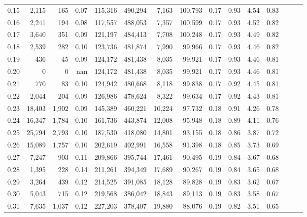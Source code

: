 \begin{tabular}{rrrrrrrrrrrrrrr}
0.15 &   2,115 &    165 &  0.07 &  115,316 &  490,294 &    7,163 &  100,793 &  0.17 &  0.93 &  4.54 &      0.83 \\
0.16 &   2,241 &    194 &  0.08 &  117,557 &  488,053 &    7,357 &  100,599 &  0.17 &  0.93 &  4.52 &      0.82 \\
0.17 &   3,640 &    351 &  0.09 &  121,197 &  484,413 &    7,708 &  100,248 &  0.17 &  0.93 &  4.49 &      0.82 \\
0.18 &   2,539 &    282 &  0.10 &  123,736 &  481,874 &    7,990 &   99,966 &  0.17 &  0.93 &  4.46 &      0.82 \\
0.19 &     436 &     45 &  0.09 &  124,172 &  481,438 &    8,035 &   99,921 &  0.17 &  0.93 &  4.46 &      0.81 \\
0.20 &       0 &      0 &   nan &  124,172 &  481,438 &    8,035 &   99,921 &  0.17 &  0.93 &  4.46 &      0.81 \\
0.21 &     770 &     83 &  0.10 &  124,942 &  480,668 &    8,118 &   99,838 &  0.17 &  0.92 &  4.45 &      0.81 \\
0.22 &   2,044 &    204 &  0.09 &  126,986 &  478,624 &    8,322 &   99,634 &  0.17 &  0.92 &  4.43 &      0.81 \\
0.23 &  18,403 &  1,902 &  0.09 &  145,389 &  460,221 &   10,224 &   97,732 &  0.18 &  0.91 &  4.26 &      0.78 \\
0.24 &  16,347 &  1,784 &  0.10 &  161,736 &  443,874 &   12,008 &   95,948 &  0.18 &  0.89 &  4.11 &      0.76 \\
0.25 &  25,794 &  2,793 &  0.10 &  187,530 &  418,080 &   14,801 &   93,155 &  0.18 &  0.86 &  3.87 &      0.72 \\
0.26 &  15,089 &  1,757 &  0.10 &  202,619 &  402,991 &   16,558 &   91,398 &  0.18 &  0.85 &  3.73 &      0.69 \\
0.27 &   7,247 &    903 &  0.11 &  209,866 &  395,744 &   17,461 &   90,495 &  0.19 &  0.84 &  3.67 &      0.68 \\
0.28 &   1,395 &    228 &  0.14 &  211,261 &  394,349 &   17,689 &   90,267 &  0.19 &  0.84 &  3.65 &      0.68 \\
0.29 &   3,264 &    439 &  0.12 &  214,525 &  391,085 &   18,128 &   89,828 &  0.19 &  0.83 &  3.62 &      0.67 \\
0.30 &   5,043 &    715 &  0.12 &  219,568 &  386,042 &   18,843 &   89,113 &  0.19 &  0.83 &  3.58 &      0.67 \\
0.31 &   7,635 &  1,037 &  0.12 &  227,203 &  378,407 &   19,880 &   88,076 &  0.19 &  0.82 &  3.51 &      0.65 \\

\end{tabular}
